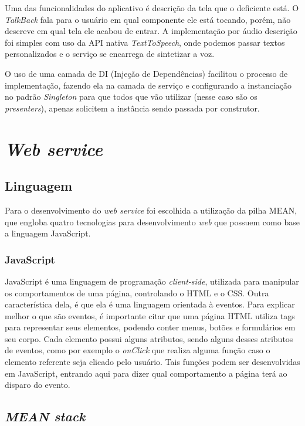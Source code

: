\documentclass[a4paper, 12pt]{article}
\begin{document}
Uma das funcionalidades do aplicativo é descrição da tela que o deficiente está. O \textit{TalkBack} fala para o usuário em qual componente ele está tocando, porém, não descreve em qual tela ele acabou de entrar. 
A implementação por áudio descrição foi simples com uso da API nativa \textit{TextToSpeech}, onde podemos passar textos personalizados e o serviço se encarrega de sintetizar a voz.

O uso de uma camada de DI (Injeção de Dependências) facilitou o processo de implementação, fazendo ela na camada de serviço e configurando a instanciação no padrão \textit{Singleton} para que todos que vão utilizar (nesse caso são os \textit{presenters}), apenas solicitem a instância sendo passada por construtor.

\section{\itshape Web service}

\subsection{Linguagem}

Para o desenvolvimento do \textit{web service} foi escolhida a utilização da pilha MEAN, que engloba quatro tecnologias para desenvolvimento \textit{web} que possuem como base a linguagem JavaScript.


\subsubsection{JavaScript}

JavaScript é uma linguagem de programação \textit{client-side}, utilizada para manipular os comportamentos de uma página, controlando o HTML e o CSS. Outra característica dela, é que ela é uma linguagem orientada à eventos.
Para explicar melhor o que são eventos, é importante citar que uma página HTML utiliza tags para representar seus elementos, podendo conter menus, botões e formulários em seu corpo. Cada elemento possui alguns atributos, sendo alguns desses atributos de eventos, como por exemplo o \textit{onClick} que realiza alguma função caso o elemento referente seja clicado pelo usuário.
Tais funções podem ser desenvolvidas em JavaScript, entrando aqui para dizer qual comportamento a página terá ao disparo do evento.\\

\subsection{\itshape MEAN stack}
\end{document}
